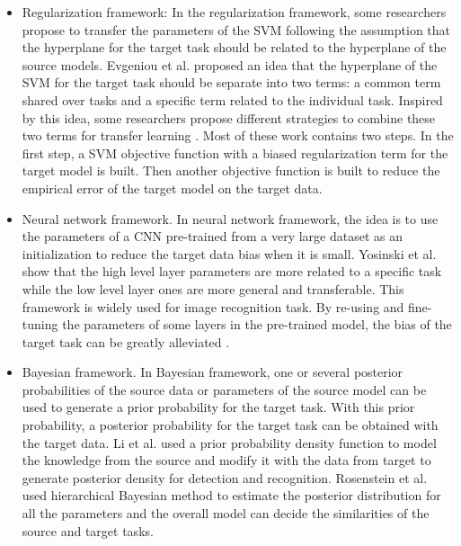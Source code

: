 \begin{itemize}
	\item Regularization framework: In the regularization framework, some researchers propose to transfer the parameters of the SVM following the assumption that the hyperplane for the target task should be related to the hyperplane of the source models. Evgeniou et al. \cite{evgeniou2004regularized} proposed an idea that the hyperplane of the SVM for the target task should be separate into two terms: a common term shared over tasks and a specific term related to the individual task. Inspired by this idea, some researchers propose different strategies to combine these two terms for transfer learning \cite{aytar2011tabula} \cite{tommasi2010safety} \cite{yang2007cross}. Most of these work contains two steps. In the first step, a SVM objective function with a biased regularization term for the target model is built. Then another objective function is built to reduce the empirical error of the target model on the target data.
	\item Neural network framework. In neural network framework, the idea is to use the parameters of a CNN pre-trained from a very large dataset as an initialization to reduce the target data bias when it is small. Yosinski et al. \cite{yosinski2014transferable} show that the high level layer parameters are more related to a specific task while the low level layer ones are more general and transferable. This framework is widely used for image recognition task. By re-using and fine-tuning the parameters of some layers in the pre-trained model, the bias of the target task can be greatly alleviated \cite{Chatfield14} \cite{hoffman2013one}  \cite{zeiler2014visualizing} \cite{NIPS2014_Zhou}. 
	\item Bayesian framework. In Bayesian framework, one or several posterior probabilities of the source data or parameters of the source model can be used to generate a prior probability for the target task. With this prior probability, a posterior probability for the target task can be obtained with the target data.
	Li et al. \cite{fei2006one} used a prior probability density function to model the knowledge from the source and modify it with the data from target to generate posterior density for detection and recognition. 
	Rosenstein et al. \cite{rosenstein2005transfer} used hierarchical Bayesian method to estimate the posterior distribution for all the parameters and the overall model can decide the similarities of the source and target tasks. 
\end{itemize}

